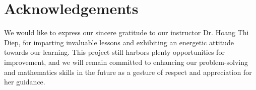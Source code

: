 \chapter*{Acknowledgements}
We would like to express our sincere gratitude to our instructor Dr. Hoang Thi Diep, for imparting invaluable lessons and exhibiting an energetic attitude towards our learning. This project still harbors plenty opportunities for improvement, and we will remain committed to enhancing our problem-solving and mathematics skills in the future as a gesture of respect and appreciation for her guidance.